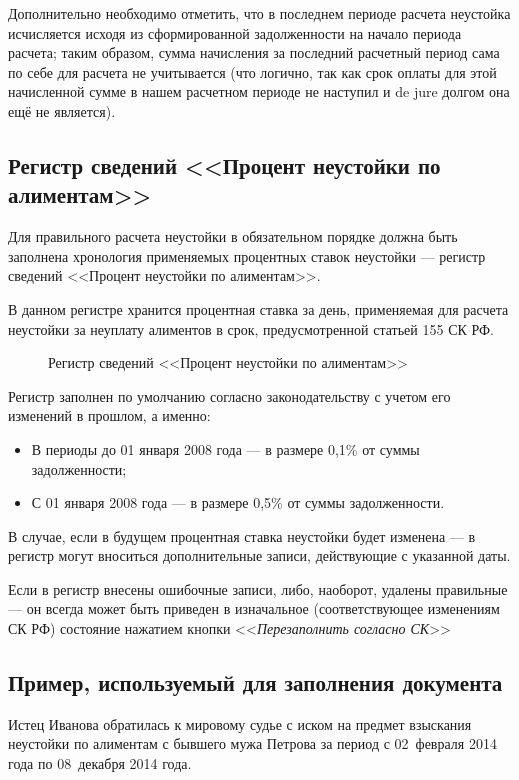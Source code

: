 \documentclass[a4paper,12pt,draft]{article}
\begin{document}
Дополнительно необходимо отметить, что в последнем периоде расчета неустойка исчисляется исходя из сформированной задолженности на начало периода расчета; таким образом, сумма начисления за последний расчетный период сама по себе для расчета не учитывается (что логично, так как срок оплаты для этой начисленной сумме в нашем расчетном периоде не наступил и de jure долгом она ещё не является).
\subsection{Регистр сведений <<Процент неустойки по алиментам>>}
Для правильного расчета неустойки в обязательном порядке должна быть заполнена хронология применяемых процентных ставок неустойки --- регистр сведений <<Процент неустойки по алиментам>>.

В данном регистре хранится процентная ставка за день, применяемая для расчета неустойки за неуплату алиментов в срок, предусмотренной статьей 155 СК РФ. 
\begin{figure}[h]
\caption{Регистр сведений <<Процент неустойки по алиментам>>}
\label{ris:razm_neus}
\end{figure}

Регистр заполнен по умолчанию согласно законодательству с учетом его изменений в прошлом, а именно:
\begin{itemize}
\item В периоды до 01 января 2008 года --- в размере 0,1\% от суммы задолженности;
\item С 01 января 2008 года --- в размере 0,5\% от суммы задолженности.
\end{itemize}

В случае, если в будущем процентная ставка неустойки будет изменена --- в регистр могут вноситься дополнительные записи, действующие с указанной даты.

Если в регистр внесены ошибочные записи, либо, наоборот, удалены правильные --- он всегда может быть приведен в изначальное (соответствующее изменениям СК РФ) состояние нажатием кнопки <<{\it Перезаполнить согласно СК}>>
\subsection{Пример, используемый для заполнения документа}
\label{sec:neus}
Истец Иванова обратилась к мировому судье с иском на предмет взыскания не\-ус\-тойки по алиментам с бывшего мужа Петрова за период с 02~февраля 2014 года по 08~декабря 2014 года.
\end{document}
